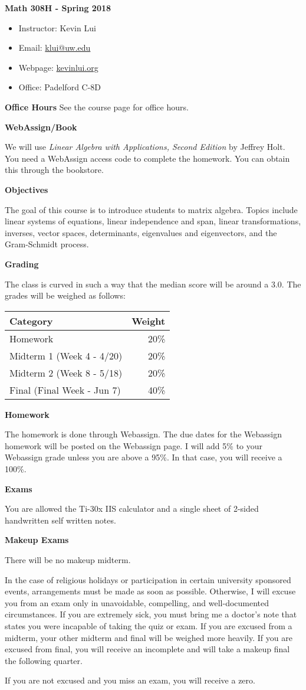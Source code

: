 \documentclass{article}
\begin{document}
\textbf{\huge  Math 308H - Spring 2018}
\begin{itemize}
    \item
        Instructor: Kevin Lui
    \item
        Email: \href{mailto:klui@uw.edu}{klui@uw.edu}
    \item
        Webpage: \url{kevinlui.org}
    \item
        Office: Padelford C-8D
\end{itemize}

\textbf{Office Hours}
See the course page for office hours.

\textbf{WebAssign/Book}

We will use \textit{Linear Algebra with Applications, Second Edition} by
Jeffrey Holt. You need a WebAssign access code to complete the homework. You
can obtain this through the bookstore.

\textbf{Objectives}

The goal of this course is to introduce students to matrix algebra. Topics
include linear systems of equations, linear independence and span, linear
transformations, inverses, vector spaces, determinants, eigenvalues and
eigenvectors, and the Gram-Schmidt process.

\textbf{Grading}

The class is curved in such a way that the median score will be around a 3.0.
The grades will be weighed as follows:

\begin{tabular}{ l r }
    Category  & Weight   \\
    \hline
    Homework  & 20\%      \\
    Midterm 1 (Week 4 - 4/20) & 20\%      \\
    Midterm 2 (Week 8 - 5/18) & 20\%      \\
    Final (Final Week - Jun 7)    & 40\%
\end{tabular}

\textbf{Homework}

The homework is done through Webassign. The due dates for the Webassign
homework will be posted on the Webassign page. I will add 5\% to your
Webassign grade unless you are above a 95\%. In that case, you will receive a
100\%.

\textbf{Exams}

You are allowed the Ti-30x IIS calculator and a single sheet of 2-sided
handwritten self written notes.

\textbf{Makeup Exams}

There will be no makeup midterm.

In the case of religious holidays or participation in certain university
sponsored events, arrangements must be made as soon as possible. Otherwise, I
will excuse you from an exam only in unavoidable, compelling, and
well-documented circumstances. If you are extremely sick, you must bring me a
doctor's note that states you were incapable of taking the quiz or exam. If you
are excused from a midterm, your other midterm and final will be weighed more
heavily. If you are excused from final, you will receive an incomplete and will
take a makeup final the following quarter.

If you are not excused and you miss an exam, you will receive a zero.
\end{document}
